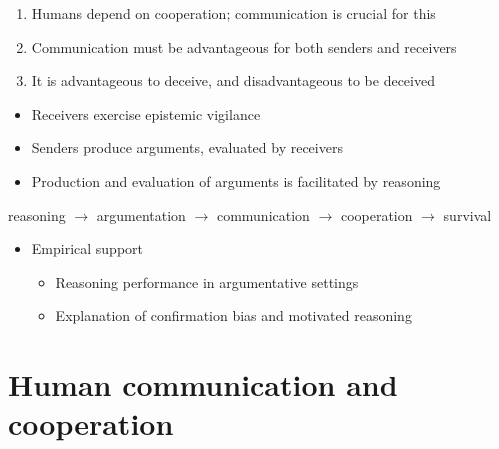 \documentclass[xcolor=table]{beamer}       %
\begin{document}
\begin{frame}{\insertsection}
    \begin{block}{\citet{MS11}}
    \begin{enumerate}
        \item Humans depend on cooperation; communication is crucial for this
        \item Communication must be advantageous for both senders and receivers
        \item It is advantageous to deceive, and disadvantageous to be deceived
    \end{enumerate}
    \pause
    \begin{itemize}
        \item Receivers exercise epistemic vigilance
        \item Senders produce arguments, evaluated by receivers
        \item Production and evaluation of arguments is facilitated by \alert{reasoning}
    \end{itemize}
    \end{block}
    \centering
    \pause reasoning
    \pause $\to$ argumentation
    \pause $\to$ communication
    \pause $\to$ cooperation
    \pause $\to$ survival
    \pause
    \medskip
    \begin{itemize}
        \item Empirical support
            \begin{itemize}
                \item Reasoning performance in argumentative settings
                \item Explanation of confirmation bias and motivated reasoning
            \end{itemize}
    \end{itemize}
\end{frame}

\section{Human communication and cooperation}
\end{document}
